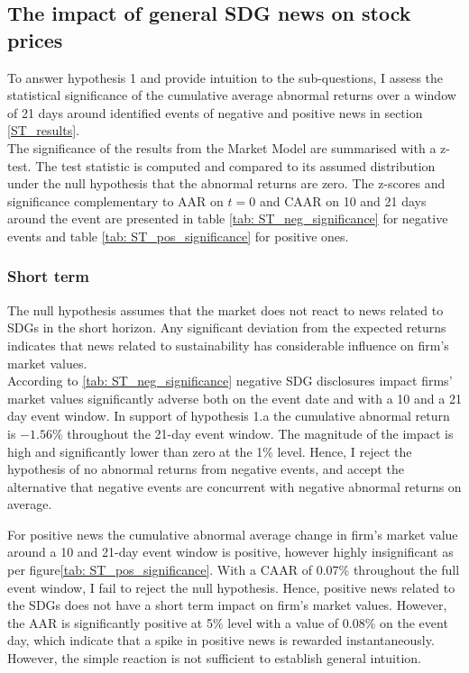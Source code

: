 

\subsection{The impact of general SDG news on stock prices} \label{sec: short_term_analysis}

To answer hypothesis 1 and provide intuition to the sub-questions, I assess the statistical significance of the cumulative average abnormal returns over a window of 21 days around identified events of negative and positive news in section \ref{ST_results}.  \\

The significance of the results from the Market Model are summarised with a z-test. The test statistic is computed and compared to its assumed distribution under the null hypothesis that the abnormal returns are zero. The z-scores and significance complementary to AAR on $t=0$ and CAAR on 10 and 21 days around the event are presented in table \ref{tab: ST_neg_significance} for negative events and table \ref{tab: ST_pos_significance} for positive ones.  

\subsubsection{Short term}

The null hypothesis assumes that the market does not react to news related to SDGs in the short horizon. Any significant deviation from the expected returns indicates that news related to sustainability has considerable influence on firm's market values.  \\
 
According to \ref{tab: ST_neg_significance} negative SDG disclosures impact firms' market values significantly adverse both on the event date and with a 10 and a 21 day event window. In support of hypothesis 1.a the cumulative abnormal return is $-1.56\%$ throughout the 21-day event window. The magnitude of the impact is high and significantly lower than zero at the 1\% level. Hence, I reject the hypothesis of no abnormal returns from negative events, and accept the alternative that negative events are concurrent with negative abnormal returns on average. 

For positive news the cumulative abnormal average change in firm's market value around a 10 and 21-day event window is positive, however highly insignificant as per figure\ref{tab: ST_pos_significance}. With a CAAR of 0.07\% throughout the full event window, I fail to reject the null hypothesis. Hence, positive news related to the SDGs does not have a short term impact on firm's market values. However, the AAR is significantly positive at 5\% level with a value of 0.08\% on the event day, which indicate that a spike in positive news is rewarded instantaneously. However, the simple reaction is not sufficient to establish general intuition.

